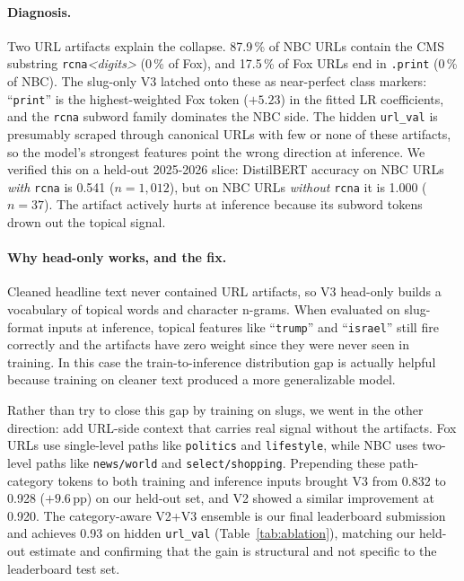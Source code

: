 \documentclass[11pt]{article}
\begin{document}
\paragraph{Diagnosis.}
Two URL artifacts explain the collapse. 87.9\,\% of NBC URLs contain the CMS substring \texttt{rcna}\textit{<digits>} (0\,\% of Fox), and 17.5\,\% of Fox URLs end in \texttt{.print} (0\,\% of NBC). The slug-only V3 latched onto these as near-perfect class markers: ``\texttt{print}'' is the highest-weighted Fox token ($+5.23$) in the fitted LR coefficients, and the \texttt{rcna} subword family dominates the NBC side. The hidden \texttt{url\_val} is presumably scraped through canonical URLs with few or none of these artifacts, so the model's strongest features point the wrong direction at inference. We verified this on a held-out 2025-2026 slice: DistilBERT accuracy on NBC URLs \emph{with} \texttt{rcna} is 0.541 ($n{=}1{,}012$), but on NBC URLs \emph{without} \texttt{rcna} it is 1.000 ($n{=}37$). The artifact actively hurts at inference because its subword tokens drown out the topical signal.

\paragraph{Why head-only works, and the fix.}
Cleaned headline text never contained URL artifacts, so V3 head-only builds a vocabulary of topical words and character n-grams. When evaluated on slug-format inputs at inference, topical features like ``\texttt{trump}'' and ``\texttt{israel}'' still fire correctly and the artifacts have zero weight since they were never seen in training. In this case the train-to-inference distribution gap is actually helpful because training on cleaner text produced a more generalizable model.

Rather than try to close this gap by training on slugs, we went in the other direction: add URL-side context that carries real signal without the artifacts. Fox URLs use single-level paths like \texttt{politics} and \texttt{lifestyle}, while NBC uses two-level paths like \texttt{news/world} and \texttt{select/shopping}. Prepending these path-category tokens to both training and inference inputs brought V3 from 0.832 to 0.928 ($+9.6$\,pp) on our held-out set, and V2 showed a similar improvement at 0.920. The category-aware V2+V3 ensemble is our final leaderboard submission and achieves 0.93 on hidden \texttt{url\_val} (Table~\ref{tab:ablation}), matching our held-out estimate and confirming that the gain is structural and not specific to the leaderboard test set.
\end{document}
